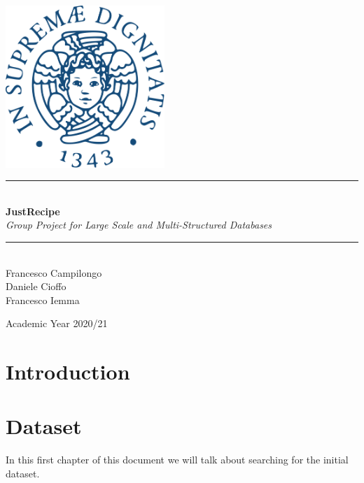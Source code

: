 \documentclass[a4paper]{report}
\newcommand{\HRule}{\rule{\linewidth}{0.5mm}}
\begin{document}
\begin{titlepage}
	\begin{center}
		
		\includegraphics[width=0.45\textwidth]{img/unipi.png}~\\[2.5cm]
		
		
		\HRule \\[0.4cm]
		{ \LARGE 
			\textbf{JustRecipe}\\[0.4cm]
			\emph{Group Project for Large Scale and Multi-Structured Databases}\\[0.4cm]
		}
		\HRule \\[1.5cm]
		
		
		
		{ \large
			Francesco Campilongo \\[0.1cm]
			Daniele Cioffo \\[0.1cm]
			Francesco Iemma \\[0.1cm]
		}
		
		\vfill

		
		
		{\large Academic Year 2020/21}
		
	\end{center}
\end{titlepage}


\tableofcontents

\chapter*{Introduction}

\chapter{Dataset}
In this first chapter of this document we will talk about searching for the initial dataset.
\end{document}
